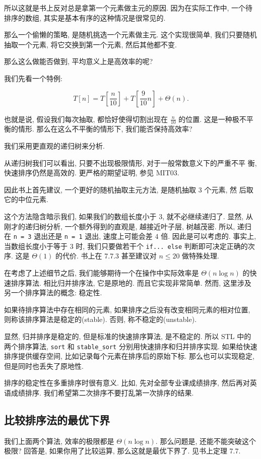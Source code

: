 \documentclass[a4paper]{ctexart}
\theoremstyle{definition}
\theoremstyle{definition}
\begin{document}
所以这就是书上反对总是拿第一个元素做主元的原因. 因为在实际工作中,
一个待排序的数组, 其实是基本有序的这种情况是很常见的.

那么一个偷懒的策略, 是随机挑选一个元素做主元. 这个实现很简单,
我们只要随机抽取一个元素, 将它交换到第一个元素, 然后其他都不变.

那么这么做能否做到, 平均意义上是高效率的呢?

我们先看一个特例:

$$
T[n] = T[\frac{n}{10}] + T[\frac{9}{10}n] + \Theta(n).
$$

也就是说, 假设我们每次抽取, 都恰好使得切割出现在 $\frac{n}{10}$ 的位置.
这是一种极不平衡的情形. 那么在这么不平衡的情形下, 我们能否保持高效率? 

我们采用更直观的递归树来分析.

从递归树我们可以看出, 只要不出现极限情形, 对于一般常数意义下的严重不平
衡, 快速排序仍然是高效的. 更严格的期望证明, 参见 MIT03.

因此书上首先建议, 一个更好的随机抽取主元方法, 是随机抽取 3 个元素, 然
后取它的中位元素. 

这个方法隐含暗示我们, 如果我们的数组长度小于 3, 就不必继续递归了. 显然,
从刚才的递归树分析, 一个额外得到的直观是, 越接近叶子层, 树越茂密. 所以,
递归在 \verb|n = 3| 退出还是 \verb|n = 1| 退出, 速度上可能会差 $4$ 倍.
因此是可以考虑的. 事实上, 当数组长度小于等于 $3$ 时, 我们只要做若干个\newline
\verb|if... else| 判断即可决定正确的次序. 这是 $\Theta(1)$ 的代价.
书上在 7.7.3 甚至建议对 $n \leq 20$ 做特殊处理.

在考虑了上述细节之后, 我们能够期待一个在操作中实际效率是
$\Theta(n\log n)$ 的快速排序算法. 相比归并排序法, 它是原地的.
而且它实现非常简单. 然而, 这里涉及另一个排序算法的概念: 稳定性. 

 如果待排序算法中存在相同的元素,
如果排序之后没有改变相同元素的相对位置, 则称该排序算法是稳定的(stable).
否则, 称不稳定的(unstable).

显然, 归并排序是稳定的, 但是标准的快速排序算法, 是不稳定的.
所以 STL 中的两个排序算法, \verb|sort| 和 \verb|stable_sort|
分别用快速排序和归并排序实现. 如果给快速排序提供缓存空间,
比如记录每个元素在排序后的原始下标. 那么也可以实现稳定,
但是同时也丢失了原地性. 

排序的稳定性在多重排序时很有意义. 比如, 先对全部专业课成绩排序,
然后再对英语成绩排序. 我们希望第二次排序不要打乱第一次排序的结果. 

\subsection{比较排序法的最优下界}
我们上面两个算法, 效率的极限都是 $\Theta(n \log n)$. 那么问题是,
还能不能突破这个极限? 回答是, 如果你用了比较运算, 那么这就是最优下界了.
见书上定理 7.7.
\end{document}
